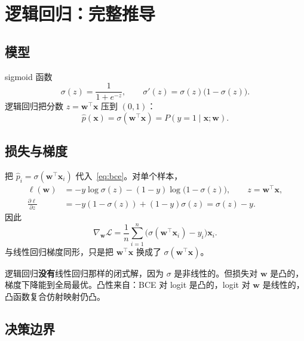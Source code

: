 \documentclass[11pt,a4paper]{article}
\theoremstyle{definition}
\theoremstyle{plain}
\theoremstyle{remark}
\newcommand{\sigm}{\sigma}
\newcommand{\loss}{\mathcal{L}}
\begin{document}
\section{逻辑回归：完整推导}
\label{sec:logreg}

\subsection{模型}

sigmoid 函数
\begin{equation}
\label{eq:sigmoid}
  \sigm(z)=\frac{1}{1+e^{-z}},\qquad
  \sigm'(z)=\sigm(z)\bigl(1-\sigm(z)\bigr).
\end{equation}
逻辑回归把分数 $z=\mathbf{w}^\top\mathbf{x}$ 压到 $(0,1)$：
\begin{equation}
  \hat p(\mathbf{x})=\sigm(\mathbf{w}^\top\mathbf{x})=P(y=1\mid\mathbf{x};\mathbf{w}).
\end{equation}

\subsection{损失与梯度}

把 $\hat p_i=\sigm(\mathbf{w}^\top\mathbf{x}_i)$ 代入~\eqref{eq:bce}。对单个样本，
\begin{align}
  \ell(\mathbf{w})&=-y\log\sigm(z)-(1-y)\log\bigl(1-\sigm(z)\bigr),\qquad z=\mathbf{w}^\top\mathbf{x},\\
  \frac{\partial\ell}{\partial z}
  &=-y(1-\sigm(z))+(1-y)\sigm(z)
  =\sigm(z)-y.
\end{align}
因此
\begin{equation}
\label{eq:loggrad}
  \nabla_{\mathbf{w}}\loss=\frac{1}{n}\sum_{i=1}^n\bigl(\sigm(\mathbf{w}^\top\mathbf{x}_i)-y_i\bigr)\mathbf{x}_i.
\end{equation}
与线性回归梯度同形，只是把 $\mathbf{w}^\top\mathbf{x}$ 换成了 $\sigm(\mathbf{w}^\top\mathbf{x})$。

\begin{keybox}
逻辑回归\textbf{没有}线性回归那样的闭式解，因为 $\sigm$ 是非线性的。但损失对 $\mathbf{w}$ 是凸的，梯度下降能到全局最优。凸性来自：BCE 对 logit 是凸的，logit 对 $\mathbf{w}$ 是线性的，凸函数复合仿射映射仍凸。
\end{keybox}

\subsection{决策边界}
\end{document}

